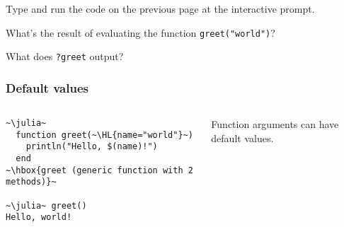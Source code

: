 \documentclass[english,serif,mathserif,xcolor=pdftex,dvipsnames,table]{beamer}
\newcounter{prompt}
\begin{document}
\begin{frame}
  \begin{exercise*}[2.A]
    Type and run the code on the previous page at the interactive
    prompt.

    \+
    What's the result of evaluating the function \texttt{greet("world")}?

    \+
    What does \texttt{?greet} output?
  \end{exercise*}
\end{frame}

\begin{frame}[fragile]
  \frametitle{Default values}
  \begin{columns}[t]
    \begin{column}{0.5\textwidth}
\begin{lstlisting}
~\julia~
  function greet(~\HL{name="world"}~)
    println("Hello, $(name)!")
  end
~\hbox{greet (generic function with 2 methods)}~

~\julia~ greet()
Hello, world!
\end{lstlisting}
    \end{column}
    \begin{column}{0.5\textwidth}
      \raggedleft
      Function arguments can have default values.
    \end{column}
  \end{columns}
\end{frame}





\end{document}
